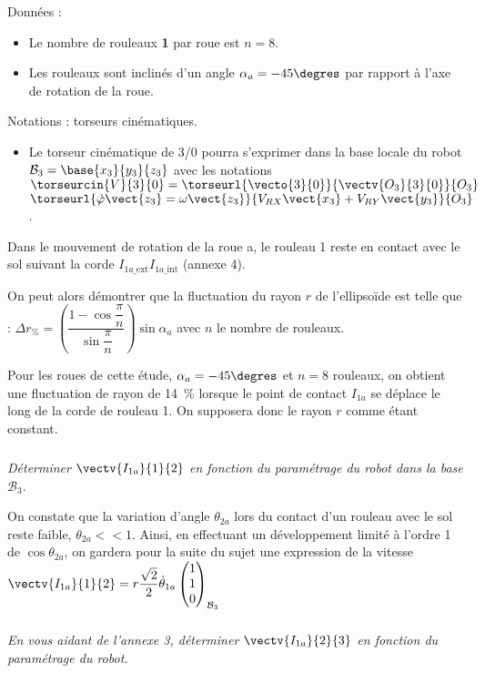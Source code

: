 Données : 
\begin{itemize}
\item Le nombre de rouleaux \textbf{1} par roue est $n=8$. 
\item Les rouleaux sont inclinés d'un angle $\alpha_a=-45\degres$ par rapport à l'axe de rotation de la roue.
\end{itemize}

Notations : torseurs cinématiques.
\begin{itemize}
\item Le torseur cinématique de 3/0 pourra s'exprimer dans la base locale du robot $\mathcal{B}_3 = \base{x_3}{y_3}{z_3}$ avec les notations $\torseurcin{V}{3}{0} = \torseurl{\vecto{3}{0}}{\vectv{O_3}{3}{0}}{O_3}$
$\torseurl{\dot{\varphi}\vect{z_3}=\omega \vect{z_3}}{V_{RX}\vect{x_3}+V_{RY}\vect{y_3}}{O_3}$.
\end{itemize}

Dans le mouvement de rotation de la roue a, le rouleau 1 reste en contact avec le sol suivant la corde 
$I_{1a\_\text{ext}}I_{1a\_\text{int}}$ (annexe 4).


On peut alors démontrer que la fluctuation du rayon $r$ de l'ellipsoïde est telle que : $\Delta r_{\%} = \left( \dfrac{1-\cos\dfrac{\pi}{n}}{\sin \dfrac{\pi }{n}}\right)\sin \alpha_a$ avec $n$ le nombre de rouleaux. 


Pour les roues de cette étude, $\alpha_a=-45\degres$ et $n=8$ rouleaux, on obtient une fluctuation de rayon de \SI{14}{\%} lorsque le point de contact $I_{1a}$ se déplace le long de la corde de rouleau 1. On supposera donc le rayon $r$ comme étant constant. 

\subparagraph{}
\textit{Déterminer $\vectv{I_{1a}}{1}{2}$ en fonction du paramétrage du robot dans la base $\mathcal{B}_3$.}
\ifprof%
\begin{corrige}
\end{corrige}\else\fi

On constate que la variation d'angle $\theta_{2a}$ lors du contact d'un rouleau avec le sol reste faible, 
$\theta_{2a} << 1$. Ainsi, en effectuant un développement limité à l'ordre 1 de $\cos \theta_{2a}$, on gardera pour la suite du sujet une expression de la vitesse $\vectv{I_{1a}}{1}{2}=r\dfrac{\sqrt{2}}{2}\dot{\theta}_{1a} \begin{pmatrix}
1 \\ 1 \\ 0 \end{pmatrix}_{\mathcal{B}_3}$


\subparagraph{}
\textit{En vous aidant de l'annexe 3, déterminer $\vectv{I_{1a}}{2}{3}$ en fonction du paramétrage du robot.}
\ifprof%
\begin{corrige}
\end{corrige}\else\fi

